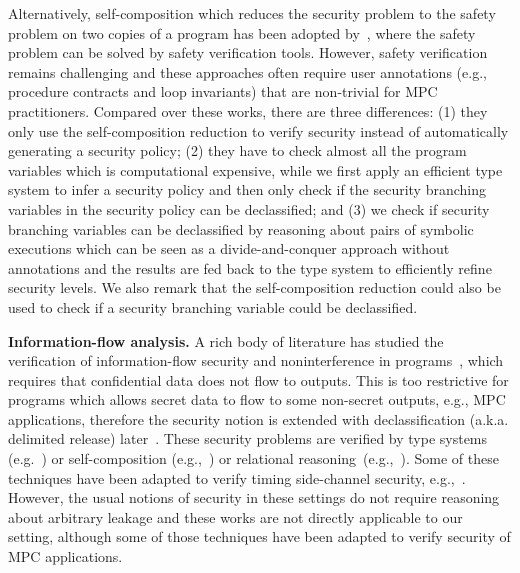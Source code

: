Alternatively, self-composition  which reduces the security problem to
the safety problem on two copies of a program has been adopted by~\cite{RastogiMHH13,mpcleak18,RastogiSH19},
where the safety problem can be solved by safety verification tools.
However, safety verification remains challenging and these approaches often require user annotations (e.g., procedure contracts and loop invariants) that are non-trivial for MPC practitioners. %
Compared over these works,
there are three differences:
(1) they only use the self-composition reduction to verify security instead of automatically generating a security policy;
(2) they have to check almost all the program variables which is computational expensive,
 while we first apply an efficient type system to infer a security policy
and then only check if the security branching variables in the security policy
can be declassified;
and (3) we check if security branching variables can be declassified by reasoning about pairs of symbolic executions which can be seen as a divide-and-conquer approach
without annotations and the results are fed back to the type system to efficiently refine security levels.
We also remark that the self-composition reduction could also be used to check if a security branching variable
could be declassified.








\smallskip
\noindent
{\bf Information-flow analysis.}
A rich body of literature has studied the verification of information-flow security and noninterference
in programs~\cite{DenningD77,GoguenM82a}, which requires that confidential data does not flow to
outputs. This is too restrictive for programs which allows secret data to flow to some non-secret outputs, e.g.,
MPC applications, therefore the security notion is extended with declassification (a.k.a. delimited release) later~\cite{LiZ05,SabelfeldS09}.
These security problems are verified by type systems (e.g.~\cite{VolpanoIS96,SabelfeldM03,LiZ05}) or
self-composition (e.g.,~\cite{TerauchiA05,BartheDR11}) or relational reasoning~(e.g.,~\cite{AmtoftBB06,SousaD16,BartheCK11}).
Some of these techniques have been adapted to verify timing side-channel security, e.g.,~\cite{AlmeidaBBDE16,ChenFD17,YangVSGM18,CauligiSJBWRGBJ19}.
However, the usual notions of security in these settings do not require reasoning about arbitrary leakage
and these works are not directly applicable to our setting, although some of those techniques have been adapted to verify
security of MPC applications.




